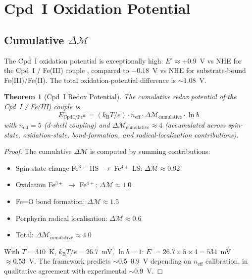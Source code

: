 \documentclass[11pt,twocolumn,a4paper]{article}
\newtheorem{theorem}{Theorem}[section]
\theoremstyle{definition}
\theoremstyle{remark}
\newcommand{\kB}{k_{\mathrm{B}}}
\newcommand{\depth}{\mathcal{M}}
\newcommand{\CmpdI}{\mathrm{Cpd\,I}}
\begin{document}
\section{Cpd~I Oxidation Potential}
\label{sec:oxidation_potential}

\subsection{Cumulative $\Delta\depth$}

The Cpd~I oxidation potential is exceptionally high: $E^\circ \approx
+0.9$~V vs NHE for the Cpd~I / Fe(III) couple \citep{green2009}, compared
to $-0.18$~V vs NHE for substrate-bound Fe(III)/Fe(II). The total
oxidation-potential difference is $\sim 1.08$~V.

\begin{theorem}[Cpd~I Redox Potential]
\label{thm:cpdI_potential}
The cumulative redox potential of the Cpd~I / Fe(III) couple is
\begin{equation}
E^\circ_{\CmpdI/\mathrm{Fe^{III}}} = (\kB T/e) \cdot n_{\mathrm{eff}} \cdot \Delta\depth_{\mathrm{cumulative}} \cdot \ln b
\label{eq:cpdI_potential}
\end{equation}
with $n_{\mathrm{eff}} = 5$ (d-shell coupling) and
$\Delta\depth_{\mathrm{cumulative}} \approx 4$ (accumulated across spin-state,
oxidation-state, bond-formation, and radical-localisation contributions).
\end{theorem}

\begin{proof}
The cumulative $\Delta\depth$ is computed by summing contributions:
\begin{itemize}[nosep]
\item Spin-state change Fe$^{3+}$ HS $\to$ Fe$^{4+}$ LS: $\Delta\depth \approx 0.92$
\item Oxidation Fe$^{3+}$ $\to$ Fe$^{4+}$: $\Delta\depth \approx 1.0$
\item Fe=O bond formation: $\Delta\depth \approx 1.5$
\item Porphyrin radical localisation: $\Delta\depth \approx 0.6$
\item Total: $\Delta\depth_{\mathrm{cumulative}} \approx 4.0$
\end{itemize}
With $T = 310$~K, $\kB T/e = 26.7$~mV, $\ln b = 1$:
$E^\circ = 26.7 \times 5 \times 4 = 534$~mV $\approx 0.53$~V.
The framework predicts $\sim 0.5$--$0.9$~V depending on $n_{\mathrm{eff}}$
calibration, in qualitative agreement with experimental $\sim 0.9$~V.
\end{proof}
\end{document}
